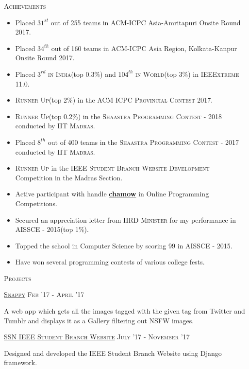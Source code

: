 \documentclass[11pt]{article}
\begin{document}
	{\centering\Large{\textsc{Achievements}} \hrulefill}
		
	\begin{itemize}
	\setlength\itemsep{-0.25em}
	\item Placed \textsc{$31^{st}$} out of 255 teams in \textsc{ACM-ICPC} Asia-Amritapuri Onsite Round 2017.
	\item Placed \textsc{$34^{th}$} out of 160 teams in \textsc{ACM-ICPC} Asia Region, Kolkata-Kanpur Onsite Round 2017.
	\item Placed \textsc{$3^{rd}$ in India}(top 0.3\%) and \textsc{$104^{th}$ in World}(top 3\%) in \textsc{IEEExtreme 11.0}.
	\item \textsc{Runner Up}(top 2\%) in the \textsc{ACM ICPC Provincial Contest 2017}.
	\item \textsc{Runner Up}(top 0.2\%) in the \textsc{Shaastra Programming Contest - 2018} conducted by \textsc{IIT Madras}.
	\item Placed \textsc{$8^{th}$} out of 400 teams in the \textsc{Shaastra Programming Contest - 2017} conducted by \textsc{IIT Madras}.
	\item \textsc{Runner Up} in the \textsc{IEEE Student Branch Website Development} Competition in the Madras Section.
	\item Active participant with handle \textbf{\href{https://www.stopstalk.com/user/profile/chamow}{chamow}} in Online Programming Competitions.	
	\item Secured an appreciation letter from \textsc{HRD Minister} for my performance in \textsc{AISSCE - 2015}(top 1\%).	
	\item Topped the school in Computer Science by scoring 99 in AISSCE - 2015.
	\item Have won several programming contests of various college fests.
	
	\end{itemize}
 	
	\vspace{2mm}

	{\centering\Large{\textsc{Projects}} \hrulefill}
		
	\vspace{2mm}
	\large{\textsc{\href{https://chamow97.github.io/snappy/}{Snappy}}}   \hfill \small\textsc{Feb '17 - April '17}
	\begin{itemize}
	\small
	{
	\item A web app which gets all the images tagged with the given tag from Twitter and Tumblr and displays it as a Gallery filtering out NSFW images.
	}
	\end{itemize}	
	\vspace{2mm}
	\large{\textsc{\href{http://ssnieee.herokuapp.com/}{SSN IEEE Student Branch Website}}}   \hfill \small\textsc{July '17 - November '17}
	\begin{itemize}
	\small
	{
	\item Designed and developed the IEEE Student Branch Website using Django framework. 
	}
	\end{itemize}	
	\vspace{3mm}
	
\end{document}
